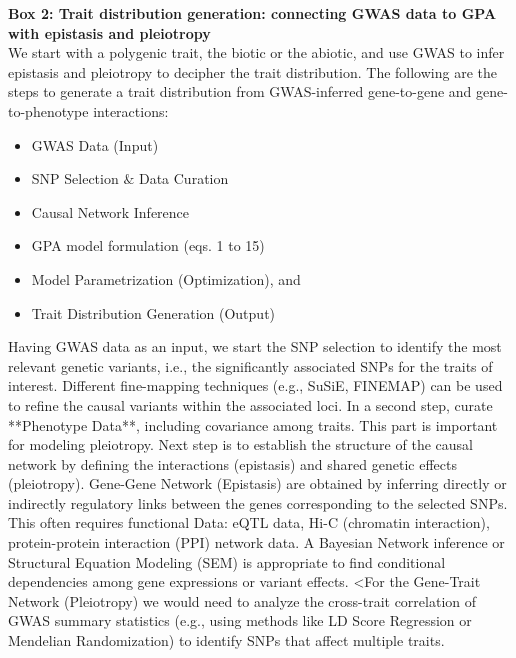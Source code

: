 \documentclass[a4paper,12pt]{elsarticle}
\begin{document}
\maketitle

\begin{tcolorbox}[%
title=Model parametrization,
    enhanced, 
    breakable,
    frame hidden,
    overlay broken = {
        \draw[line width=0.5mm, red, rounded corners]
        (frame.north west) rectangle (frame.south east);},
    ]{}
{\bf Box 2: Trait distribution generation: connecting GWAS data to GPA with epistasis and pleiotropy}\\ 

We start with a polygenic trait, the biotic or the abiotic, and use GWAS to infer epistasis and pleiotropy to decipher the trait distribution. The following are the steps to generate a trait distribution from GWAS-inferred gene-to-gene and gene-to-phenotype interactions:
\begin{itemize}
\item GWAS Data (Input)
\item SNP Selection $\&$ Data Curation
\item Causal Network Inference
\item GPA model formulation (eqs. 1 to 15)
\item Model Parametrization (Optimization), and 
\item Trait Distribution Generation (Output)
\end{itemize}
Having GWAS data as an input, we start the SNP selection to identify the most relevant genetic variants, i.e., the significantly associated SNPs for the traits of interest. Different fine-mapping techniques (e.g., SuSiE, FINEMAP) can be used to refine the causal variants within the associated loci. In a second step, curate **Phenotype Data**, including covariance among traits. This part is important for modeling pleiotropy. Next step is to establish the structure of the causal network by defining the interactions (epistasis) and shared genetic effects (pleiotropy). Gene-Gene Network (Epistasis) are obtained by inferring directly or indirectly regulatory links between the genes corresponding to the selected SNPs. This often requires functional Data: eQTL data, Hi-C (chromatin interaction), protein-protein interaction (PPI) network data. A Bayesian Network inference or Structural Equation Modeling (SEM) is appropriate to find conditional dependencies among gene expressions or variant effects. <For the Gene-Trait Network (Pleiotropy) we would need to analyze the cross-trait correlation of GWAS summary statistics (e.g., using methods like LD Score Regression or Mendelian Randomization) to identify SNPs that affect multiple traits. 


\end{tcolorbox}
\end{document}
